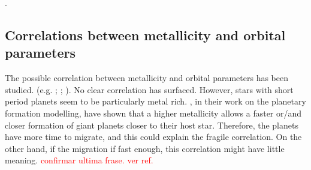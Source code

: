 \documentclass[dvips,12pt,a4paper]{report}
\begin{document}
{. %



\subsection {Correlations between metallicity and orbital parameters}

The possible correlation between metallicity and orbital parameters has been studied. (e.g. \citeauthor{Gonzalez-1998} \citeyear{Gonzalez-1998}; \citeauthor{Santos-2003} \citeyear{Santos-2003}; \citeauthor {Fischer-2005} \citeyear {Fischer-2005}). No clear correlation has surfaced. However, stars with short period planets seem to be particularly metal rich. \citet{Ida-2004b}, in their work on the planetary formation modelling, have shown that a higher metallicity allows a faster or/and closer formation of giant planets closer to their host star. Therefore, the planets have more time to migrate, and this could explain the fragile correlation.  On the other hand, if the migration if fast enough, this correlation might have little meaning. \textcolor{red}{confirmar ultima frase. ver ref.}

}
\end{document}
